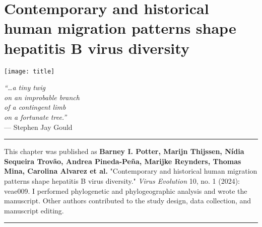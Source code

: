 \chapter{Contemporary and historical human migration patterns shape hepatitis B virus diversity}\label{ch:chapter3}

\begin{minipage}[b]{0.6\textwidth}
    \texttt{[image: title]} %
  \end{minipage}
  \hfill
  \begin{minipage}[b]{0.35\textwidth}
    \footnotesize
    \begin{flushright}
      \textit{``\ldots a tiny twig\\on an improbable branch\\of a contingent limb\\on a fortunate tree.''} \\
      --- Stephen Jay Gould
    \end{flushright}
    \vspace{2cm}
  \end{minipage}

\clearpage

\hrule
\vspace*{12pt}
This chapter was published as \textbf{Barney I. Potter, Marijn Thijssen, Nídia Sequeira Trovão, Andrea Pineda-Peña, Marijke Reynders, Thomas Mina, Carolina Alvarez et al.} "Contemporary and historical human migration patterns shape hepatitis B virus diversity." \textit{Virus Evolution} 10, no. 1 (2024): veae009.
I performed phylogenetic and phylogeographic analysis and wrote the manuscript.
Other authors contributed to the study design, data collection, and manuscript editing.
\vspace*{12pt}
\hrule

\onehalfspacing

